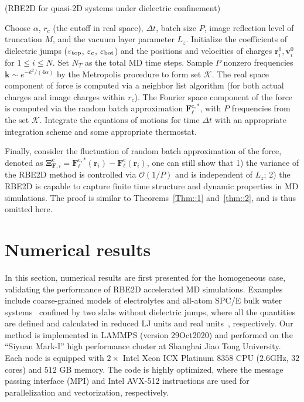 \begin{algorithm}[H]
 \caption{(RBE2D for quasi-2D systems under dielectric confinement)}\label{alg::RBEalg}
 \begin{algorithmic}[1]
  \State Choose $\alpha$, $r_c$ (the cutoff in real space), $\Delta t$, batch size $P$, image reflection level of truncation $M$, and the vacuum layer parameter $L_z$. Initialize the coefficients of dielectric jumps ($\varepsilon_{\rm{top}}$, $\varepsilon_{\rm{c}}$, $\varepsilon_{\rm{bot}}$) and the positions and velocities of charges $\bm{r}^0_i, \bm{v}^0_i$ for $1\le i\le N$. Set $N_T$ as the total MD time steps.
  \State Sample $P$ nonzero frequencies $\bm{k}\sim e^{-k^2/(4\alpha)}$ by the Metropolis procedure to form set $\mathcal{K}$.
  \State The real space component of force is computed via a neighbor list algorithm (for both actual charges and image charges within $r_c$).
  \State The Fourier space component of  {the} force is computed via the random batch approximation $\bm{F}_{\ell}^{\text{c},*}$, with $P$ frequencies from the set $\mathcal{K}$.
  \State Integrate the equations of motions for time $\Delta t$ with  {an} appropriate integration scheme and some appropriate thermostat. 
  \EndFor
 \end{algorithmic}
\end{algorithm}

Finally, consider the fluctuation of random batch approximation of the force, denoted as $\bm{\Xi}_{\bm{F},i}^{\text{c}}=\bm{F}_{\ell}^{\text{c},*}(\bm{r}_i)-\bm{F}_{\ell}^{\text{c}}(\bm{r}_i)$, one can still show that 1) the variance of the RBE2D method is controlled via $\mathcal{O}(1/P)$ and is independent of $L_z$; 2) the RBE2D is capable to capture finite time structure and dynamic properties in MD simulations. 
The proof is similar to Theorems~\ref{Thm::1} and~\ref{thm::2}, and is thus omitted here.

\section{Numerical results}\label{sec::numerical}

In this section, numerical results are first presented for the homogeneous case, validating the performance of RBE2D accelerated MD simulations. 
Examples include coarse-grained models of electrolytes and all-atom SPC/E bulk water systems~\cite{berendsen1987missing} confined by two slabs without dielectric jumps, where all the quantities are defined and calculated in reduced LJ units and real units~\cite{frenkel2023understanding}, respectively.
Our method is implemented in LAMMPS (version 29Oct2020) \cite{thompson2021lammps} and performed on the ``Siyuan Mark-I'' high performance cluster at Shanghai Jiao Tong University. 
Each node is equipped with $2\times$ Intel Xeon ICX Platinum $8358$ CPU ($2.6$GHz, $32$ cores) and $512$ GB memory.
The code is highly optimized, where the message passing interface (MPI) and Intel AVX-512 instructions are used for parallelization and vectorization, respectively.

